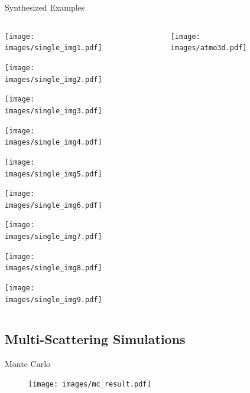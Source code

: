 \documentclass[compress,red,12pt]{beamer}
\begin{document}
\begin{frame}{Synthesized Examples}
  \begin{columns}[C]
    \begin{column}{.7\textwidth}
      \begin{overlayarea}{\columnwidth}{8cm}
        {\centerline{\texttt{[image: images/single\_img1.pdf]}}}
        {\centerline{\texttt{[image: images/single\_img2.pdf]}}}
        {\centerline{\texttt{[image: images/single\_img3.pdf]}}}
        {\centerline{\texttt{[image: images/single\_img4.pdf]}}}
        {\centerline{\texttt{[image: images/single\_img5.pdf]}}}
        {\centerline{\texttt{[image: images/single\_img6.pdf]}}}
        {\centerline{\texttt{[image: images/single\_img7.pdf]}}}
        {\centerline{\texttt{[image: images/single\_img8.pdf]}}}
        {\centerline{\texttt{[image: images/single\_img9.pdf]}}}
      \end{overlayarea}
    \end{column}
    \begin{column}{.3\textwidth}
      \begin{figure}
        \centering
        \texttt{[image: images/atmo3d.pdf]}
      \end{figure}
    \end{column}
  \end{columns}
\end{frame}


\subsection{Multi-Scattering Simulations}

\begin{frame}{Monte Carlo}
  \begin{figure}
    \centering
    \begin{overprint}
      {\centerline{\def\svgwidth{0.5\linewidth}\small{}}}
      {\centerline{\texttt{[image: images/mc\_result.pdf]}}}
      {\centerline{\def\svgwidth{0.5\linewidth}\small{}}}
    \end{overprint}
  \end{figure}
\end{frame}
\end{document}
